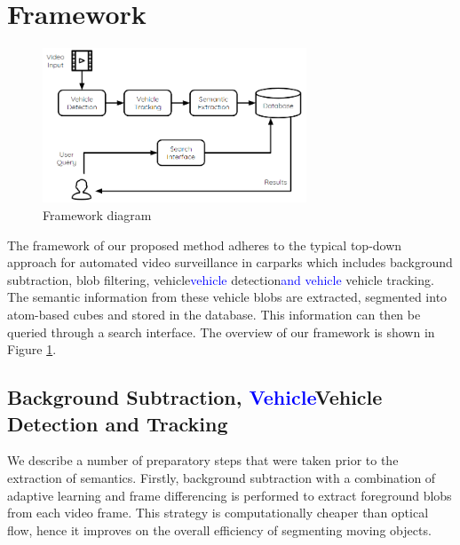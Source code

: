 \documentclass[runningheads]{llncs}
\newcommand{\ian}[1]{\textcolor{red}{#1}}
\newcommand{\lk}[1]{\textcolor{blue}{#1}}
\newcommand{\cc}[1]{\textcolor{teal}{#1}}
\newcommand{\ian}[1]{}   %
\newcommand{\lk}[1]{}   %
\newcommand{\cc}[1]{}   %
\begin{document}
\section{Framework}
\begin{figure}[t]
  \centering
  \includegraphics[width=0.7\textwidth]{Images/framework.PNG}
  \caption{Framework diagram}
  \label{fig:FDiagram}
  \vspace{-0.75em}
\end{figure}
The framework of our proposed method adheres to the typical top-down approach for automated video surveillance in carparks \cite{lim2017} which includes background subtraction, blob filtering, vehicle\lk{vehicle} %
detection\lk{and vehicle} %
vehicle tracking. The semantic information from these vehicle blobs are %
extracted, %
segmented into atom-based cubes and stored in the database. %
This information can then be queried through a search interface. The overview of our framework is %
shown in Figure \ref{fig:FDiagram}. 
 
 \subsection{Background Subtraction, \lk{Vehicle}Vehicle Detection and Tracking}
We describe a number of preparatory steps that were taken prior to the extraction of semantics. Firstly, background subtraction with a combination of adaptive learning and frame differencing \cite{lim2017} is performed to extract foreground blobs from each video frame. %
This strategy is computationally cheaper than optical flow, %
 hence it improves on the overall efficiency of segmenting moving objects. %
\end{document}
